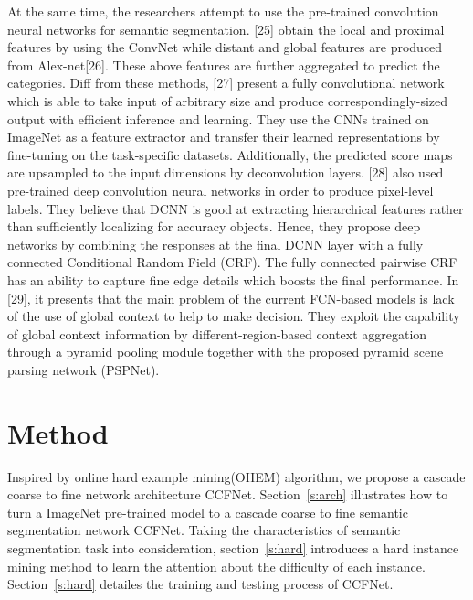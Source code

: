 \documentclass[10.5pt,compsoc]{TsT}
\theoremstyle{mystyle}
\begin{document}
{At the same time, the researchers attempt to use the pre-trained convolution neural networks for semantic segmentation. [25] obtain the local and proximal features by using the ConvNet while distant and global features are produced from Alex-net[26]. These above features are further aggregated to predict the categories. Diff from these methods, [27] present a fully convolutional network which is able to take input of arbitrary size and produce correspondingly-sized output with efficient inference and learning. They use the CNNs trained on ImageNet as a feature extractor and transfer their learned representations by fine-tuning on the task-specific datasets. Additionally, the predicted score maps are upsampled to the input dimensions by deconvolution layers. [28] also used pre-trained deep convolution neural networks in order to produce pixel-level labels. They believe that DCNN is good at extracting hierarchical features rather than sufficiently localizing for accuracy objects. Hence, they propose deep networks by combining the responses at the final DCNN layer with a fully connected Conditional Random Field (CRF). The fully connected pairwise CRF has an ability to capture fine edge details which boosts the final performance. In [29], it presents that the main problem of the current FCN-based models is lack of the use of global context to help to make decision. They exploit the capability of global context information by different-region-based context aggregation through a pyramid pooling module together with the proposed pyramid scene parsing network (PSPNet).

\section{Method}
\label{s:Method}
\noindent


Inspired by online hard example mining(OHEM) algorithm, we propose a cascade coarse to fine network architecture CCFNet. 
Section~\ref{s:arch} illustrates how to turn a ImageNet pre-trained model to a cascade coarse to fine semantic segmentation network CCFNet.
Taking the characteristics of semantic segmentation task into consideration, section~\ref{s:hard} introduces a hard instance mining method to learn the attention about the difficulty of each instance.
Section~\ref{s:hard} detailes the training and testing process of CCFNet. 

}
\end{document}
